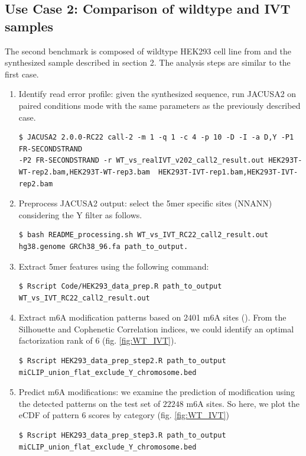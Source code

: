 \documentclass[times, 11pt, a4paper]{article}
\begin{document}
\subsection*{Use Case 2: Comparison of wildtype and IVT samples}
The second benchmark is composed of wildtype HEK293 cell line from \cite{pratanwanich2021identification} and the synthesized sample described in section 2.    
The analysis steps are similar to the first case. 
\begin{enumerate}
\item Identify read error profile: given the synthesized sequence, run JACUSA2 on paired conditions mode with the same parameters as the previously described case. 
\begin{verbatim}
$ JACUSA2 2.0.0-RC22 call-2 -m 1 -q 1 -c 4 -p 10 -D -I -a D,Y -P1 FR-SECONDSTRAND
-P2 FR-SECONDSTRAND -r WT_vs_realIVT_v202_call2_result.out HEK293T-WT-rep2.bam,HEK293T-WT-rep3.bam	HEK293T-IVT-rep1.bam,HEK293T-IVT-rep2.bam
\end{verbatim}
\item Preprocess JACUSA2 output: select the 5mer specific sites (NNANN) considering the Y filter as follows. 
\begin{verbatim} 
$ bash README_processing.sh WT_vs_IVT_RC22_call2_result.out hg38.genome GRCh38_96.fa path_to_output.
\end{verbatim}
\item Extract 5mer features using the following command:
\begin{verbatim} 
$ Rscript Code/HEK293_data_prep.R path_to_output WT_vs_IVT_RC22_call2_result.out
\end{verbatim}
\item Extract m6A modification patterns based on 2401 m6A sites (). From the Silhouette and Cophenetic Correlation indices, we could identify an optimal factorization rank of 6 (fig. \ref{fig:WT_IVT}).
\begin{verbatim} 
$ Rscript HEK293_data_prep_step2.R path_to_output miCLIP_union_flat_exclude_Y_chromosome.bed
\end{verbatim} 
\item Predict m6A modifications: we examine the prediction of modification using the detected patterns on the test set of $22248$ m6A sites. So here, we plot the eCDF of pattern 6 scores by category (fig. \ref{fig:WT_IVT})
\begin{verbatim} 
$ Rscript HEK293_data_prep_step3.R path_to_output miCLIP_union_flat_exclude_Y_chromosome.bed
\end{verbatim} 

\end{enumerate}
\end{document}
